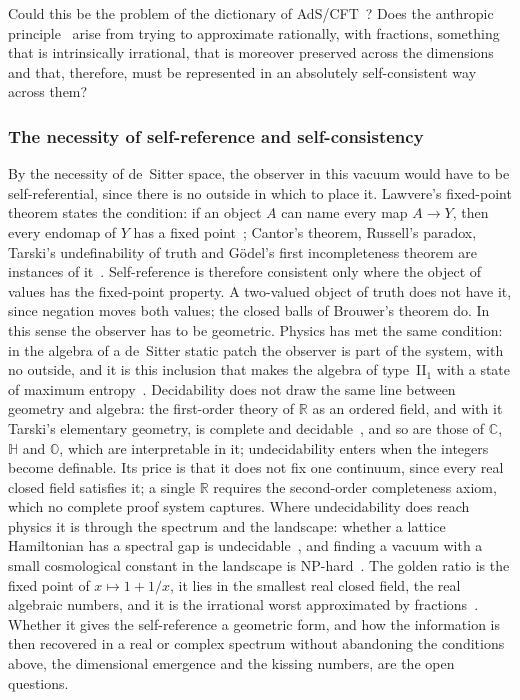 \documentclass[11pt,reqno]{amsart}
\numberwithin{equation}{section}
\theoremstyle{remark}
\begin{document}
Could this be the problem of the dictionary of AdS/CFT~\cite{Mal98}? Does the anthropic
principle~\cite{Sus03} arise from trying to approximate rationally, with fractions, something that is
intrinsically irrational, that is moreover preserved across the dimensions and that, therefore, must
be represented in an absolutely self-consistent way across them?

\subsubsection{The necessity of self-reference and self-consistency}
By the necessity of de~Sitter space, the observer in this vacuum would have to be self-referential,
since there is no outside in which to place it. Lawvere's fixed-point theorem states the condition: if
an object $A$ can name every map $A\to Y$, then every endomap of $Y$ has a fixed point~\cite{Law69};
Cantor's theorem, Russell's paradox, Tarski's undefinability of truth and G\"odel's first
incompleteness theorem are instances of it~\cite{Yan03}. Self-reference is therefore consistent only
where the object of values has the fixed-point property. A two-valued object of truth does not have it,
since negation moves both values; the closed balls of Brouwer's theorem do. In this sense the observer
has to be geometric. Physics has met the same condition: in the algebra of a de~Sitter static patch
the observer is part of the system, with no outside, and it is this inclusion that makes the algebra
of type~II$_1$ with a state of maximum entropy~\cite{CLPW23}. Decidability does not draw the same line
between geometry and algebra: the first-order theory of $\mathbb R$ as an ordered field, and with it
Tarski's elementary geometry, is complete and decidable~\cite{Tar51}, and so are those of $\mathbb C$,
$\mathbb H$ and $\mathbb O$, which are interpretable in it; undecidability enters when the integers
become definable. Its price is that it does not fix one continuum, since every real closed field
satisfies it; a single $\mathbb R$ requires the second-order completeness axiom, which no complete
proof system captures. Where undecidability does reach physics it is through the spectrum and the
landscape: whether a lattice Hamiltonian has a spectral gap is undecidable~\cite{CPW15}, and finding a
vacuum with a small cosmological constant in the landscape is NP-hard~\cite{DD07}. The golden ratio is
the fixed point of $x\mapsto1+1/x$, it lies in the smallest real closed field, the real algebraic
numbers, and it is the irrational worst approximated by fractions~\cite{Hur91}. Whether it gives the
self-reference a geometric form, and how the information is then recovered in a real or complex
spectrum without abandoning the conditions above, the dimensional emergence and the kissing numbers,
are the open questions.
\end{document}
